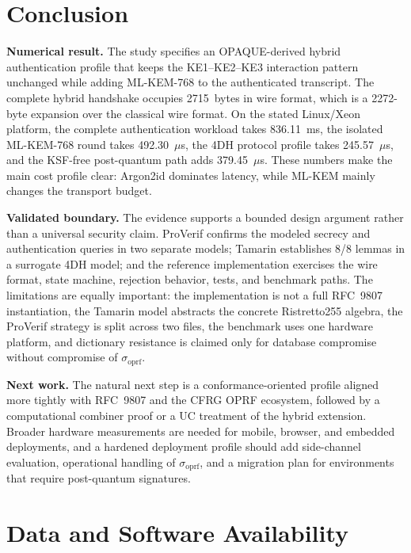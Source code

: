 \documentclass[preprint,12pt]{elsarticle}
\newcommand{\sigoprf}{\sigma_{\mathrm{oprf}}}
\theoremstyle{remark}
\begin{document}
\section{Conclusion}

\textbf{Numerical result.} The study specifies an OPAQUE-derived hybrid
authentication profile that keeps the KE1--KE2--KE3 interaction pattern
unchanged while adding ML-KEM-768 to the authenticated transcript. The
complete hybrid handshake occupies 2715~bytes in wire format, which is a
2272-byte expansion over the classical wire format. On the stated Linux/Xeon
platform, the complete authentication workload takes 836.11~ms, the
isolated ML-KEM-768 round takes 492.30~$\mu$s, the 4DH protocol profile
takes 245.57~$\mu$s, and the KSF-free post-quantum path adds
379.45~$\mu$s. These numbers make the main cost profile clear: Argon2id
dominates latency, while ML-KEM mainly changes the transport budget.

\textbf{Validated boundary.} The evidence supports a bounded design
argument rather than a universal security claim. ProVerif confirms the
modeled secrecy and authentication queries in two separate models;
Tamarin establishes 8/8 lemmas in a surrogate 4DH model; and the
reference implementation exercises the wire format, state machine,
rejection behavior, tests, and benchmark paths. The limitations are
equally important: the implementation is not a full RFC~9807
instantiation, the Tamarin model abstracts the concrete Ristretto255
algebra, the ProVerif strategy is split across two files, the benchmark
uses one hardware platform, and dictionary resistance is claimed only
for database compromise without compromise of $\sigoprf$.

\textbf{Next work.} The natural next step is a conformance-oriented
profile aligned more tightly with RFC~9807 and the CFRG OPRF ecosystem,
followed by a computational combiner proof or a UC treatment of the
hybrid extension. Broader hardware measurements are needed for mobile,
browser, and embedded deployments, and a hardened deployment profile
should add side-channel evaluation, operational handling of $\sigoprf$,
and a migration plan for environments that require post-quantum
signatures.

\section*{Data and Software Availability}
\end{document}
